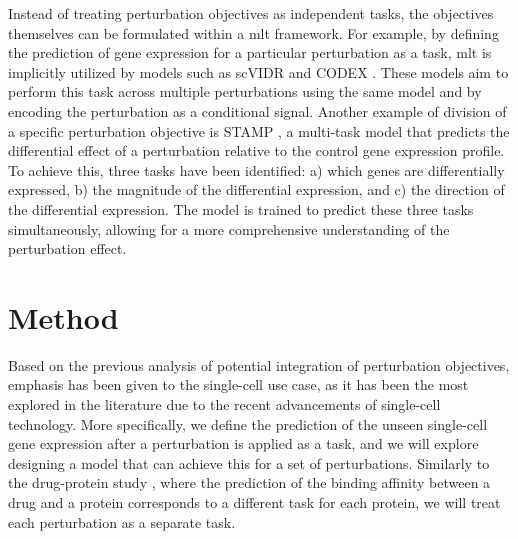 \documentclass[12pt, a4paper]{article}
\begin{document}
Instead of treating perturbation objectives as independent tasks, the objectives themselves can be formulated within a \gls{mlt} framework. For example, by defining the prediction of gene expression for a particular perturbation as a task, \gls{mlt} is implicitly utilized by models such as scVIDR \cite{kanaGenerativeModelingSinglecell2023} and CODEX \cite{schrod2024codex}. These models aim to perform this task across multiple perturbations using the same model and by encoding the perturbation as a conditional signal. Another example of division of a specific perturbation objective is STAMP \cite{gaoSubtaskDecompositionbasedLearning2024}, a multi-task model that predicts the differential effect of a perturbation relative to the control gene expression profile. To achieve this, three tasks have been identified: a) which genes are differentially expressed, b) the magnitude of the differential expression, and c) the direction of the differential expression. The model is trained to predict these three tasks simultaneously, allowing for a more comprehensive understanding of the perturbation effect.





\section{Method}
\label{sec:method}

Based on the previous analysis of potential integration of perturbation objectives, emphasis has been given to the single-cell 
use case, as it has been the most explored in the literature due to the recent advancements of single-cell technology. More specifically, we define the prediction of the unseen single-cell gene expression after a perturbation is applied as a task, and we will explore designing a model that can achieve this for a set of perturbations. Similarly to the drug-protein study \cite{allenspach2024neural}, where the prediction of the binding affinity between a drug and a protein corresponds to a different task for each protein, we will treat each perturbation as a separate task. 
\end{document}
